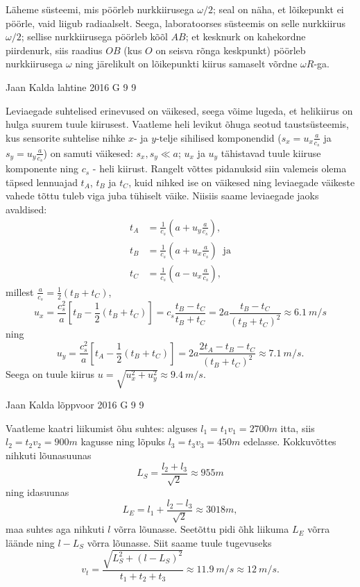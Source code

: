 \documentclass[11pt]{article}
\begin{document}
{{\ifSolution
Läheme süsteemi, mis pöörleb nurkkiirusega $\omega/2$; seal on näha, et lõikepunkt ei pöörle, vaid liigub radiaalselt.
Seega, laboratoorses süsteemis on selle nurkkiirus $\omega/2$; sellise nurkkiirusega pöörleb kõõl $AB$; et kesknurk on kahekordne piirdenurk, siis 
raadius $OB$ (kus $O$ on seisva rõnga keskpunkt) pöörleb nurkkiirusega $\omega$ ning järelikult on lõikepunkti kiirus samaselt võrdne $\omega R$-ga.
\fi
}

{Jaan Kalda} %
{lahtine} %
{2016} %
{G 9} %
{9} %
{

\ifSolution
Leviaegade suhtelised erinevused on väikesed, seega võime lugeda, et helikiirus on hulga suurem tuule kiirusest.
Vaatleme heli levikut õhuga seotud taustsüsteemis, kus sensorite suhtelise nihke $x$- ja $y$-telje sihilised komponendid ($s_x=u_x\frac a{c_s}$ ja 
$s_y=u_y\frac a{c_s}$) on samuti väikesed: $s_x, s_y\ll a$; $u_x$ ja $u_y$ tähistavad tuule kiiruse komponente ning $c_s$ - heli kiirust.
Rangelt võttes pidanuksid siin valemeis olema täpsed lennuajad $t_A$, $t_B$ ja $t_C$, kuid nihked ise on väikesed ning leviaegade 
väikeste vahede tõttu tuleb viga juba tühiselt väike. Niisiis saame leviaegade jaoks avaldised:
\begin{align*}
t_A&=\frac 1{c_s}\left(a+u_y\frac a{c_s}\right),\\
t_B&=\frac 1{c_s}\left(a+u_x\frac a{c_s}\right)\;\; \mbox{ja}\\
t_C&=\frac 1{c_s}\left(a-u_x\frac a{c_s}\right),
\end{align*}
millest $ \frac a{c_s}=\frac 12(t_B+t_C)$, $$u_x=\frac {c_s^2}a\left[t_B-\frac 12(t_B+t_C)\right]=c_s\frac{t_B-t_C}{t_B+t_C}=2a\frac{t_B-t_C}{(t_B+t_C)^2}\approx \SI{6.1}{m/s}$$
ning 
$$u_y=\frac {c_s^2}a\left[t_A-\frac 12(t_B+t_C)\right]=2a\frac{2t_A-t_B-t_C}{(t_B+t_C)^2}\approx \SI{7.1}{m/s}.$$
Seega on tuule kiirus $u=\sqrt{u_x^2+u_y^2}\approx \SI{9.4}{m/s}$.
\fi
}

{Jaan Kalda} %
{lõppvoor} %
{2016} %
{G 9} %
{9} %
{

\ifSolution
Vaatleme kaatri liikumist õhu suhtes: alguses $l_1=t_1v_1=\SI{2700}m$ itta, siis $l_2=t_2v_2=\SI{900}m$ kagusse
ning lõpuks $l_3=t_3v_3=\SI{450}m$ edelasse. Kokkuvõttes nihkuti lõunasuunas 
\[
L_S=\frac{l_2+l_3}{\sqrt 2}\approx \SI{955}m
\]
ning idasuunas
\[
L_E=l_1+\frac{l_2-l_3}{\sqrt 2}\approx \SI{3018}m,
\]
maa suhtes aga nihkuti $l$ võrra lõunasse. Seetõttu pidi õhk liikuma $L_E$ võrra läände ning $l-L_S$ võrra lõunasse. Siit saame tuule tugevuseks 
$$v_t=\frac{\sqrt{L_S^2+(l-L_S)^2}}{t_1+t_2+t_3}\approx \SI{11.9}{m/s}\approx \SI{12}{m/s}.$$ 
\fi
}

}
\end{document}
